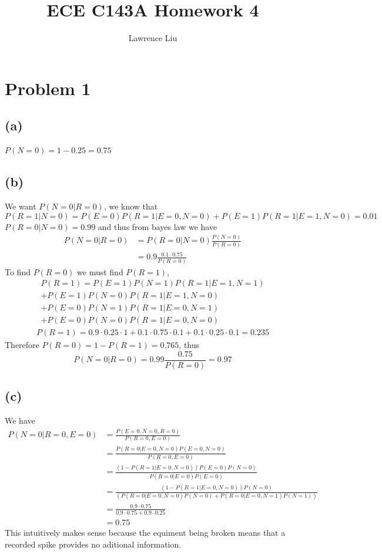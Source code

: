 \documentclass[12pt]{article}
\title{ECE C143A Homework 4}
\author{Lawrence Liu}
\begin{document}
\maketitle
\section*{Problem 1}
\subsection*{(a)}
$P(N=0)=1-0.25=\boxed{0.75}$
\subsection*{(b)}
We want $P(N=0|R=0)$, we know that
$$P(R=1|N=0)=P(E=0)P(R=1|E=0,N=0)+P(E=1)P(R=1|E=1,N=0)=0.01$$
$P(R=0|N=0)=0.99$ and thus from bayes law we have 
\begin{align*}
    P(N=0|R=0)&=P(R=0|N=0)\frac{P(N=0)}{P(R=0)}\\
    &=0.9\frac{0.1\cdot 0.75}{P(R=0)}
\end{align*}
To find $P(R=0)$ we must find $P(R=1)$,
\begin{multline*}
    P(R=1)=P(E=1)P(N=1)P(R=1|E=1,N=1)\\+P(E=1)P(N=0)P(R=1|E=1,N=0)
    \\+P(E=0)P(N=1)P(R=1|E=0,N=1)\\+P(E=0)P(N=0)P(R=1|E=0,N=0)
\end{multline*}
\begin{multline*}
    P(R=1)=0.9\cdot0.25\cdot 1+0.1\cdot0.75\cdot0.1+0.1\cdot 0.25\cdot 0.1=0.235
\end{multline*}
Therefore $P(R=0)=1-P(R=1)=0.765$, thus
$$P(N=0|R=0)=0.99\frac{0.75}{P(R=0)}=\boxed{0.97}$$
\subsection*{(c)}
We have
\begin{align*}
    P(N=0|R=0,E=0)&=\frac{P(E=0,N=0,R=0)} {P(R=0,E=0)}\\
    &=\frac{P(R=0|E=0,N=0)P(E=0,N=0)} {P(R=0,E=0)}\\
    &=\frac{(1-P(R=1|E=0,N=0))P(E=0)P(N=0)} {P(R=0|E=0)P(E=0)}\\
    &=\frac{(1-P(R=1|E=0,N=0))P(N=0)} {(P(R=0|E=0,N=0)P(N=0)+P(R=0|E=0,N=1)P(N=1))}\\
    &=\frac{0.9\cdot 0.75}{0.9\cdot 0.75+0.9\cdot 0.25}\\
    &=\boxed{0.75}
\end{align*}
This intuitively makes sense because the equiment being broken means that a recorded spike provides no aditional information.
\end{document}
